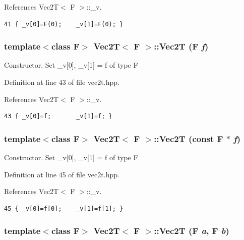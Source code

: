 References Vec2T$<$ F $>$::\_\-v.

\footnotesize\begin{verbatim}41 { _v[0]=F(0);    _v[1]=F(0); }
\end{verbatim}\normalsize 


\subsubsection{\setlength{\rightskip}{0pt plus 5cm}template$<$class F$>$ {\bf Vec2T}$<$ F $>$::{\bf Vec2T} (F {\em f})\hspace{0.3cm}{\tt  [inline]}}\label{classVec2T_4d9eba67dbd7b237be34d57f1dcd1980_4d9eba67dbd7b237be34d57f1dcd1980}


Constructor. Set \_\-v[0], \_\-v[1] = f of type F 

Definition at line 43 of file vec2t.hpp.

References Vec2T$<$ F $>$::\_\-v.

\footnotesize\begin{verbatim}43 { _v[0]=f;       _v[1]=f; }
\end{verbatim}\normalsize 


\subsubsection{\setlength{\rightskip}{0pt plus 5cm}template$<$class F$>$ {\bf Vec2T}$<$ F $>$::{\bf Vec2T} (const F $\ast$ {\em f})\hspace{0.3cm}{\tt  [inline]}}\label{classVec2T_bca52a1245192cc773b6eb1a584a24ed_bca52a1245192cc773b6eb1a584a24ed}


Constructor. Set \_\-v[0], \_\-v[1] = f of type F 

Definition at line 45 of file vec2t.hpp.

References Vec2T$<$ F $>$::\_\-v.

\footnotesize\begin{verbatim}45 { _v[0]=f[0];    _v[1]=f[1]; }
\end{verbatim}\normalsize 


\subsubsection{\setlength{\rightskip}{0pt plus 5cm}template$<$class F$>$ {\bf Vec2T}$<$ F $>$::{\bf Vec2T} (F {\em a}, F {\em b})\hspace{0.3cm}{\tt  [inline]}}\label{classVec2T_d390460ed207d2b49ad3470019c40b44_d390460ed207d2b49ad3470019c40b44}


